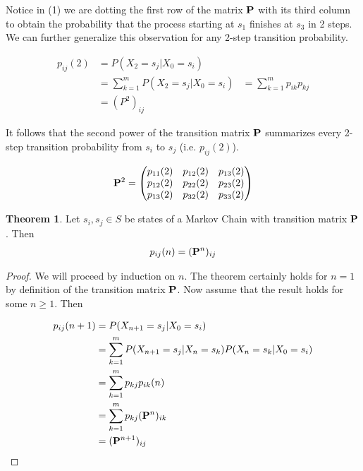 \documentclass[a4paper,12pt]{article}
\theoremstyle{definition}
\newtheorem{theorem}{Theorem}
\let\oldtextbf\mathbf
\renewcommand{\mathbf}[1]{\oldtextbf{\boldmath #1}}
\begin{document}
	Notice in (1) we are dotting the first row of the matrix $\mathbf{P}$ with its third column to obtain the probability 
	that the process starting at $s_1$ finishes at $s_3$ in 2 steps. We can further generalize this observation for any 2-step 
	transition probability.

	\begin{equation*}
		\begin{aligned}
			p_{ij}(2) &= P(X_2 = s_j|X_0 = s_i) \\ 
					&= \sum_{k=1}^{m} P(X_2 = s_j|X_0 = s_i)
					&= \sum_{k=1}^{m} p_{ik}p_{kj}\\
					&= (P^2)_{ij}
		\end{aligned}
	\end{equation*}	    

	It follows that the second power of the transition matrix $\mathbf{P}$ summarizes every 2-step transition probability 
	from $s_i$ to $s_j$ (i.e. $p_{ij}(2)$).

	\begin{equation*}
		\begin{aligned}
			\mathbf{P}^2 =
			\begin{pmatrix}
				p_{11}(2) & p_{12}(2) & p_{13}(2) \\
				p_{12}(2) & p_{22}(2) & p_{23}(2) \\
				p_{13}(2) & p_{32}(2) & p_{33}(2) \\
			\end{pmatrix}
		\end{aligned}
	\end{equation*}

	\begin{theorem}
		Let $s_i, s_j \in S$ be states of a Markov Chain with transition matrix $\mathbf{P}$. Then
		\begin{equation*}
		\begin{aligned}
			p_{ij}(n) = (\mathbf{P}^n)_{ij}
		\end{aligned}
		\end{equation*}	
	\end{theorem}
	\begin{proof}
		We will proceed by induction on $n$. The theorem certainly holds for $n=1$ by definition of the transition matrix $\mathbf{P}$.
		Now assume that the result holds for some $n \geq 1$. Then

		\begin{equation*}
		\begin{aligned}
			p_{ij}(n+1) &= P(X_{n+1} = s_j|X_0 = s_i) \\
					&= \sum_{k=1}^{m} P(X_{n+1} = s_j|X_{n} = s_k)P(X_{n} = s_k | X_0 = s_i) \\
					&= \sum_{k=1}^{m} p_{kj}p_{ik}(n) \\
					&= \sum_{k=1}^{m} p_{kj}(\mathbf{P}^{n})_{ik} \\
					&= (\mathbf{P}^{n+1})_{ij} 
		\end{aligned}
		\end{equation*}	
	\end{proof}
	
\end{document}
